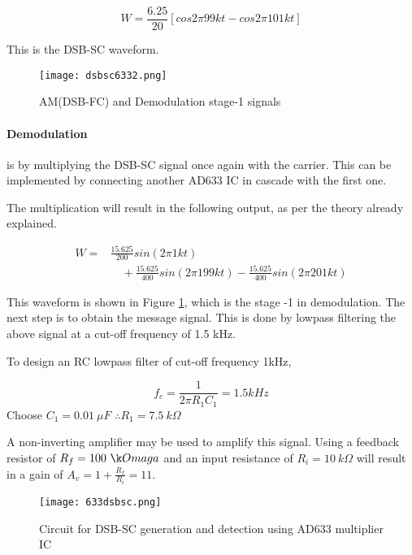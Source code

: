 \begin{equation}
W=\frac{6.25}{20}[cos 2\pi99kt-cos 2\pi101kt]
\end{equation}

 This is the DSB-SC waveform.
 
 \begin{figure}[ht]
\texttt{[image: dsbsc6332.png]}
\caption{AM(DSB-FC) and Demodulation stage-1 signals}
\label{dsbsc633plot2}
\end{figure}
 
 \paragraph{Demodulation}  is by multiplying the DSB-SC signal once again with the carrier. This can be implemented by connecting another AD633 IC in cascade with the first one.

\noindent The multiplication will result in the following output, as per the theory already explained.

\begin{equation}
\begin{split}
W=& \frac{15.625}{200}sin(2\pi 1kt)\\
&\quad  +\frac{15.625}{400}sin(2\pi199kt) -\frac{15.625}{400}sin(2\pi 201kt)
\end{split}
\end{equation}

\noindent This waveform is shown in Figure \ref{dsbsc633plot2}, which is the stage -1 in demodulation. The next step is to obtain the message signal. This is done by lowpass filtering the above signal at a cut-off frequency of 1.5 kHz.

To design an RC lowpass filter of cut-off frequency 1kHz,

\begin{equation}
f_c=\frac{1}{2\pi R_1C_1}=1.5kHz
\end{equation}
Choose $C_1=0.01\  \mu F$
$\therefore  R_1 =7.5 \ k \Omega$

A non-inverting amplifier may be used to amplify this signal. Using a feedback resistor of $R_f= 100 \ \k Omaga$ and an input resistance of $R_i=10\ k\Omega$ will result in a gain of $A_v=1+\frac{R_f}{R_i}=11$.
\begin{sidewaysfigure}[ht]
    \texttt{[image: 633dsbsc.png]}
    \caption{Circuit for DSB-SC generation and detection using AD633 multiplier IC}
    \label{DSBSCckt}
\end{sidewaysfigure}



